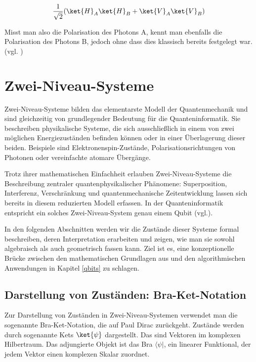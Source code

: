 \[
\frac{1}{\sqrt{2}}  ( \ket{H}_A \ket{H}_B + \ket{V}_A \ket{V}_B )
\]

Misst man also die Polarisation des Photons A, kennt man ebenfalls die Polarisation des Photons B, jedoch ohne dass dies klassisch bereits festgelegt war.
(vgl. \cite[Ch. 7]{hughes_quantum_2021})


\section{Zwei-Niveau-Systeme}
\label{Zwei-Niveau-Systeme}

Zwei-Niveau-Systeme bilden das elementarste Modell der Quantenmechanik und sind gleichzeitig von grundlegender Bedeutung für die Quanteninformatik. Sie beschreiben physikalische Systeme, die sich ausschließlich in einem von zwei möglichen Energiezuständen befinden können oder in einer Überlagerung dieser beiden. Beispiele sind Elektronenspin-Zustände, Polarisationsrichtungen von Photonen oder vereinfachte atomare Übergänge.

Trotz ihrer mathematischen Einfachheit erlauben Zwei-Niveau-Systeme die Beschreibung zentraler quantenphysikalischer Phänomene: Superposition, Interferenz, Verschränkung und quantenmechanische Zeitentwicklung lassen sich bereits in diesem reduzierten Modell erfassen. In der Quanteninformatik entspricht ein solches Zwei-Niveau-System genau einem Qubit (vgl.\autocite[Kapitel 1.2]{nielsen_quantum_2010}).

In den folgenden Abschnitten werden wir die Zustände dieser Systeme formal beschreiben, deren Interpretation erarbeiten und zeigen, wie man sie sowohl algebraisch als auch geometrisch fassen kann. Ziel ist es, eine konzeptionelle Brücke zwischen den mathematischen Grundlagen aus  und den algorithmischen Anwendungen in Kapitel \ref{qbits} zu schlagen.

\subsection{Darstellung von Zuständen: Bra-Ket-Notation}
\label{Darstellung von Zuständen: Bra-Ket-Notation}
Zur Darstellung von Zuständen in Zwei-Niveau-Systemen verwendet man die sogenannte Bra-Ket-Notation, die auf Paul Dirac zurückgeht. Zustände werden durch sogenannte Kets $\ket{\psi}$ dargestellt. Das sind Vektoren im komplexen Hilbertraum. Das adjungierte Objekt ist das Bra $\langle \psi|$, ein linearer Funktional, der jedem Vektor einen komplexen Skalar zuordnet.

